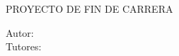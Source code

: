 \begin{titlepage}
\begin{center}
\begin{figure}[ht]
\begin{center}
		\end{center}
	\end{figure}
	

	\vspace{2cm} {\large PROYECTO DE FIN DE CARRERA} \\
	\vspace{0.5cm} \Fecha
	\vspace{1.5cm}
\end{center}

\begin{parhmargin}{8cm}{0cm}
	
	Autor: \textbf{\textit{\Carlos}}\\
	Tutores: \textbf{\textit{\Ramon}}\\
	\hspace*{1.4cm}\textbf{\textit{\Javier}}\\
\end{parhmargin}

\end{titlepage}


